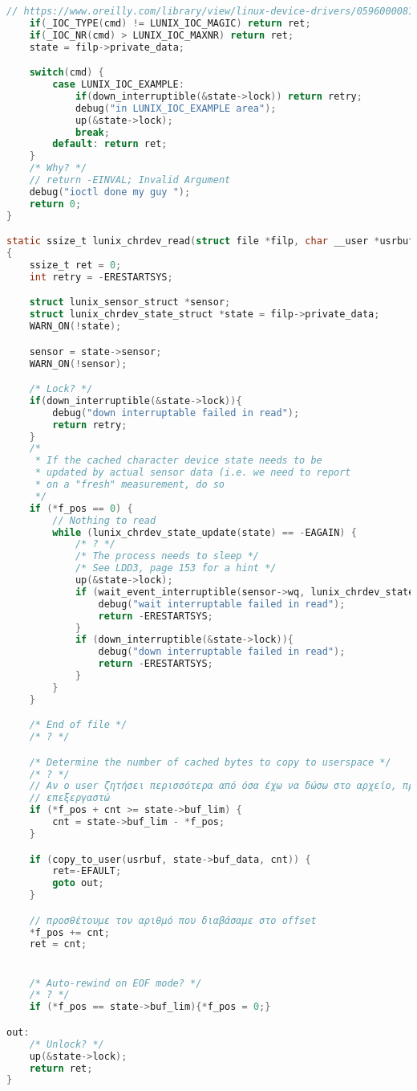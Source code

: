 \documentclass{article}
\begin{document}
\begin{lstlisting}[language=C,basicstyle=\tiny]
	// https://www.oreilly.com/library/view/linux-device-drivers/0596000081/ch05.html
	if(_IOC_TYPE(cmd) != LUNIX_IOC_MAGIC) return ret;
	if(_IOC_NR(cmd) > LUNIX_IOC_MAXNR) return ret;
	state = filp->private_data;

	switch(cmd) {
		case LUNIX_IOC_EXAMPLE:
			if(down_interruptible(&state->lock)) return retry;
			debug("in LUNIX_IOC_EXAMPLE area");
			up(&state->lock);
			break;
		default: return ret;
	}
	/* Why? */
	// return -EINVAL; Invalid Argument
	debug("ioctl done my guy ");
	return 0;
}

static ssize_t lunix_chrdev_read(struct file *filp, char __user *usrbuf, size_t cnt, loff_t *f_pos)
{
	ssize_t ret = 0;
	int retry = -ERESTARTSYS;

	struct lunix_sensor_struct *sensor;
	struct lunix_chrdev_state_struct *state = filp->private_data;
	WARN_ON(!state);

	sensor = state->sensor;
	WARN_ON(!sensor);

	/* Lock? */
	if(down_interruptible(&state->lock)){
		debug("down interruptable failed in read");
		return retry;
	}
	/*
	 * If the cached character device state needs to be
	 * updated by actual sensor data (i.e. we need to report
	 * on a "fresh" measurement, do so
	 */
	if (*f_pos == 0) {
		// Nothing to read
		while (lunix_chrdev_state_update(state) == -EAGAIN) {
			/* ? */
			/* The process needs to sleep */
			/* See LDD3, page 153 for a hint */
			up(&state->lock);
			if (wait_event_interruptible(sensor->wq, lunix_chrdev_state_needs_refresh(state))){
				debug("wait interruptable failed in read");
				return -ERESTARTSYS;
			}
			if (down_interruptible(&state->lock)){
				debug("down interruptable failed in read");
				return -ERESTARTSYS;
			}
		}
	}

	/* End of file */
	/* ? */

	/* Determine the number of cached bytes to copy to userspace */
	/* ? */
	// Αν ο user ζητήσει περισσότερα από όσα έχω να δώσω στο αρχείο, πρέπει να τα 
	// επεξεργαστώ 
	if (*f_pos + cnt >= state->buf_lim) { 
		cnt = state->buf_lim - *f_pos;
	}

	if (copy_to_user(usrbuf, state->buf_data, cnt)) {
		ret=-EFAULT;
		goto out;
	}

	// προσθέτουμε τον αριθμό που διαβάσαμε στο offset
	*f_pos += cnt;
	ret = cnt;


	/* Auto-rewind on EOF mode? */
	/* ? */
	if (*f_pos == state->buf_lim){*f_pos = 0;}

out:
	/* Unlock? */
	up(&state->lock);
	return ret;
}


\end{lstlisting}
\end{document}
